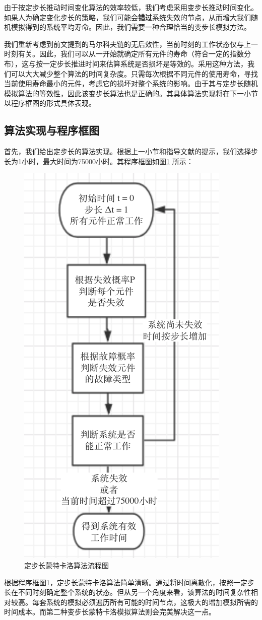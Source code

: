 \documentclass[10.5pt,twocolumn]{jbuaa}
\begin{document}
由于按定步长推动时间变化算法的效率较低，我们考虑采用变步长推动时间变化。如果人为确定变化步长的策略，我们可能会\textbf{错过}系统失效的节点，从而增大我们随机模拟得到的系统平均寿命。因此，我们需要一种合理恰当的变步长模拟方法。

我们重新考虑到前文提到的马尔科夫链的无后效性，当前时刻的工作状态仅与上一时刻有关。因此，我们可以从一开始就确定所有元件的寿命（符合一定的指数分布），这与按一定步长推进时间来估算系统是否损坏是等效的。采用这种方法，我们可以大大减少整个算法的时间复杂度。只需每次根据不同元件的使用寿命，寻找当前使用寿命最小的元件，考虑它的损坏对整个系统的影响。由于其与定步长随机模拟算法的等效性，因此该变步长算法也是正确的。其具体算法实现将在下一小节以程序框图的形式具体表现。
\subsection{算法实现与程序框图}
首先，我们给出定步长的算法实现。根据上一小节和指导文献\cite{cite1}的提示，我们选择步长为1小时，最大时间为75000小时。其程序框图如图\ref{fig:2} 所示：
\begin{figure}[H]
	\centering
	\includegraphics{fig2}
	\caption{定步长蒙特卡洛算法流程图}
	\label{fig:2}
\end{figure}
根据程序框图\ref{fig:2}，定步长蒙特卡洛算法简单清晰。通过将时间离散化，按照一定步长在不同时刻确定整个系统的状态。但从另一个角度来看，该算法的时间复杂性相对较高。每套系统的模拟必须遍历所有可能的时间节点，这极大的增加模拟所需的时间成本。而第二种变步长蒙特卡洛模拟算法则会完美解决这一点。
\end{document}
